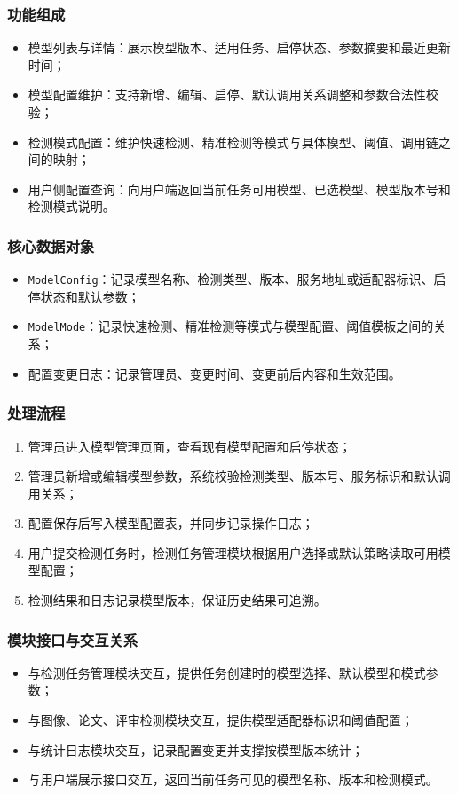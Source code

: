 \subsubsection{功能组成}
\begin{itemize}[leftmargin=2em]
    \item 模型列表与详情：展示模型版本、适用任务、启停状态、参数摘要和最近更新时间；
    \item 模型配置维护：支持新增、编辑、启停、默认调用关系调整和参数合法性校验；
    \item 检测模式配置：维护快速检测、精准检测等模式与具体模型、阈值、调用链之间的映射；
    \item 用户侧配置查询：向用户端返回当前任务可用模型、已选模型、模型版本号和检测模式说明。
\end{itemize}

\subsubsection{核心数据对象}
\begin{itemize}[leftmargin=2em]
    \item \texttt{ModelConfig}：记录模型名称、检测类型、版本、服务地址或适配器标识、启停状态和默认参数；
    \item \texttt{ModelMode}：记录快速检测、精准检测等模式与模型配置、阈值模板之间的关系；
    \item 配置变更日志：记录管理员、变更时间、变更前后内容和生效范围。
\end{itemize}

\subsubsection{处理流程}
\begin{enumerate}[leftmargin=2em]
    \item 管理员进入模型管理页面，查看现有模型配置和启停状态；
    \item 管理员新增或编辑模型参数，系统校验检测类型、版本号、服务标识和默认调用关系；
    \item 配置保存后写入模型配置表，并同步记录操作日志；
    \item 用户提交检测任务时，检测任务管理模块根据用户选择或默认策略读取可用模型配置；
    \item 检测结果和日志记录模型版本，保证历史结果可追溯。
\end{enumerate}

\subsubsection{模块接口与交互关系}
\begin{itemize}[leftmargin=2em]
    \item 与检测任务管理模块交互，提供任务创建时的模型选择、默认模型和模式参数；
    \item 与图像、论文、评审检测模块交互，提供模型适配器标识和阈值配置；
    \item 与统计日志模块交互，记录配置变更并支撑按模型版本统计；
    \item 与用户端展示接口交互，返回当前任务可见的模型名称、版本和检测模式。
\end{itemize}

